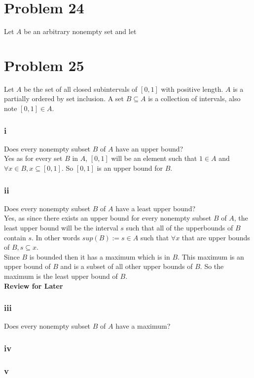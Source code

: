\documentclass{article}
\begin{document}
\section*{Problem 24}
Let $A$ be an arbitrary nonempty set and let 

\section*{Problem 25}
Let $A$  be the set of all closed subintervals of $[0,1]$ with positive length. $A$ is a partially ordered by set inclusion. A set $B \subseteq A$ is a collection of intervals, also note $[0,1] \in A$. \subsubsection*{i}
Does every nonempty subset $B$ of $A$ have an upper bound?\\
Yes as for every set $B$ in $A$, $[0,1]$ will be an element such that $1 \in A$ and $\forall x \in B , x \subseteq [0,1]$. So $[0,1]$ is an upper bound for $B$.\\
\subsubsection*{ii}
Does every nonempty subset $B$ of $A$ have a least upper bound?\\
Yes, as since there exists an upper bound for every nonempty subset $B$ of $A$, the least upper bound will be the interval $s$ such that all of the upperbounds of $B$ contain $s$. In other words $sup(B) := s \in A$ such that $\forall x$ that are upper bounds of $B, s \subseteq x$.\\
Since $B$ is bounded then it has a maximum which is in $B$. This maximum is an upper bound of $B$ and is a subset of all other upper bounds of $B$. So the maximum is the least upper bound of $B$.\\
\textbf{Review for Later}

\subsubsection*{iii}
Does every nonempty subset $B$ of $A$ have a maximum?\\

\subsubsection*{iv}

\subsubsection*{v}
\end{document}
